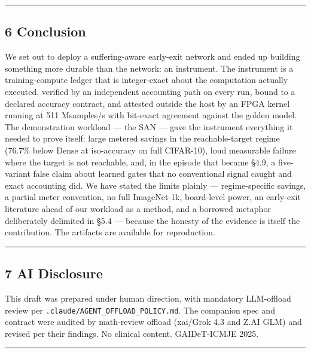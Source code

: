 \documentclass[
]{article}
\begin{document}
\begin{center}\rule{0.5\linewidth}{0.5pt}\end{center}

\hypertarget{conclusion}{%
\subsection{6 Conclusion}\label{conclusion}}

We set out to deploy a suffering-aware early-exit network and ended up
building something more durable than the network: an instrument. The
instrument is a training-compute ledger that is integer-exact about the
computation actually executed, verified by an independent accounting
path on every run, bound to a declared accuracy contract, and attested
outside the host by an FPGA kernel running at 511 Msamples/s with
bit-exact agreement against the golden model. The demonstration workload
--- the SAN --- gave the instrument everything it needed to prove
itself: large metered savings in the reachable-target regime (76.7\%
below Dense at iso-accuracy on full CIFAR-10), loud measurable failure
where the target is not reachable, and, in the episode that became §4.9,
a five-variant false claim about learned gates that no conventional
signal caught and exact accounting did. We have stated the limits
plainly --- regime-specific savings, a partial meter convention, no full
ImageNet-1k, board-level power, an early-exit literature ahead of our
workload as a method, and a borrowed metaphor deliberately delimited in
§5.4 --- because the honesty of the evidence is itself the contribution.
The artifacts are available for reproduction.

\begin{center}\rule{0.5\linewidth}{0.5pt}\end{center}

\hypertarget{ai-disclosure}{%
\subsection{7 AI Disclosure}\label{ai-disclosure}}

This draft was prepared under human direction, with mandatory
LLM-offload review per \texttt{.claude/AGENT\_OFFLOAD\_POLICY.md}. The
companion spec and contract were audited by math-review offload
(xai/Grok 4.3 and Z.AI GLM) and revised per their findings. No clinical
content. GAIDeT-ICMJE 2025.

\begin{center}\rule{0.5\linewidth}{0.5pt}\end{center}
\end{document}
